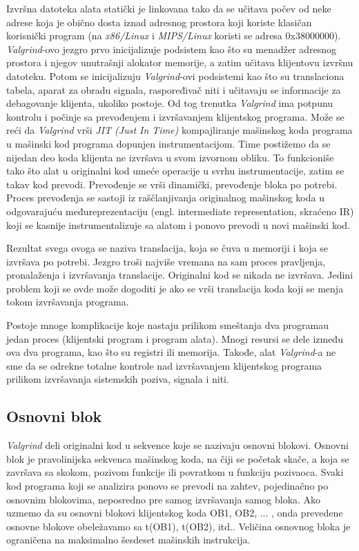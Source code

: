 \documentclass[12pt,oneside]{memoir}
\theoremstyle{plain}
\theoremstyle{definition}
\begin{document}
Izvršna datoteka alata statički je linkovana tako da se učitava počev od neke adrese koja je obično dosta iznad adresnog prostora koji koriste klasičan korisnički program (na \textit{x86/Linux} i \textit{MIPS/Linux} koristi se adresa 0x38000000). \textit{Valgrind}-ovo jezgro prvo inicijalizuje podsistem kao što su menadžer adresnog prostora i njegov unutrašnji alokator memorije, a zatim učitava klijentovu izvršnu datoteku. Potom se inicijalizuju \textit{Valgrind}-ovi podsistemi kao što su translaciona tabela, aparat za obradu signala, raspoređivač niti i učitavaju se informacije za debagovanje klijenta, ukoliko postoje. Od tog trenutka \textit{Valgrind} ima potpunu kontrolu i počinje sa prevođenjem i izvršavanjem klijentskog programa. Može se reći da \textit{Valgrind} vrši \textit{JIT (Just In Time)} kompajliranje mašinskog koda programa u mašinski kod programa dopunjen instrumentacijom. Time postižemo da se nijedan deo koda klijenta ne izvršava u svom izvornom obliku. To funkcioniše tako što alat u originalni kod umeće operacije u svrhu instrumentacije, zatim se takav kod prevodi. Prevođenje se vrši dinamički, prevođenje bloka po potrebi. Proces prevođenja se sastoji iz raščlanjivanja originalnog mašinskog koda u odgovarajuću međureprezentaciju (engl. intermediate representation, skraćeno IR) koji se kasnije instrumentalizuje sa alatom i ponovo prevodi u novi mašinski kod.

Rezultat svega ovoga se naziva translacija, koja se čuva u memoriji i koja se izvršava po potrebi. Jezgro troši najviše vremana na sam proces pravljenja,  pronalaženja i izvršavanja translacije. Originalni kod se nikada ne izvršava. Jedini problem koji se ovde može dogoditi je ako se vrši translacija koda koji se menja tokom izvršavanja programa.

Postoje mnoge komplikacije koje nastaju prilikom smeštanja dva programau jedan proces (klijentski program i program alata). Mnogi resursi se dele između ova dva programa, kao što su registri ili memorija. Takođe, alat \textit{Valgrind}-a ne sme da se odrekne totalne kontrole nad izvršavanjem klijentskog programa prilikom izvršavanja sistemskih poziva, signala i niti.

\subsection*{Osnovni blok}
\textit{Valgrind} deli originalni kod u sekvence koje se nazivaju osnovni blokovi. Osnovni blok je pravolinijska sekvenca mašinskog koda, na čiji se početak skače, a koja se završava sa skokom, pozivom funkcije ili povratkom u funkciju pozivaoca. Svaki kod programa koji se analizira ponovo se prevodi na zahtev, pojedinačno po osnovnim blokovima, neposredno pre samog izvršavanja samog bloka. Ako uzmemo da su osnovni blokovi klijentskog koda OB1, OB2, ... , onda prevedene osnovne blokove obeležavamo sa t(OB1), t(OB2), itd.. Veličina osnovnog bloka je ograničena na maksimalno šesdeset mašinskih instrukcija.
\end{document}
